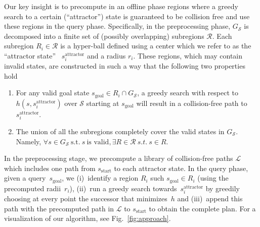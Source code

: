 \documentclass[letterpaper]{article} %
\newcommand{\calL}{\ensuremath{\mathcal{L}}\xspace}
\newcommand{\calS}{\ensuremath{\mathcal{S}}\xspace}
\newcommand{\calR}{\ensuremath{\mathcal{R}}\xspace}
\newcommand{\sAttract}{\ensuremath{s^{\text{attractor}}_i}\xspace}
\newcommand{\sStart}{\ensuremath{s_{\text{start}}\xspace}}
\newcommand{\sGoal}{\ensuremath{s_{\text{goal}}\xspace}}
\begin{document}
Our key insight is to precompute in an offline phase regions where a greedy search to a certain (``attractor'') state is guaranteed to be collision free and use these regions in the query phase.
Specifically, in the preprocessing phase, $G_\calS$ is decomposed into a finite  set of (possibly overlapping) subregions $\calR$.
Each subregion $R_i \in \calR$ is a hyper-ball defined using a center which we refer to as the ``attractor state''~
\sAttract and a radius $r_i$.
These regions, which may contain invalid states, are constructed in such a way that the following two properties hold
\begin{enumerate}[label={\textbf{P\arabic*}}]
  \item \label{property:1} For any valid goal state $s_{\text{goal}} \in R_i \cap G_\calS$, a greedy search with respect to $h(s, \sAttract)$ over $\calS$ starting at $\sGoal$ will result in a collision-free path to \sAttract.
  \item \label{property:2} The union of all the subregions completely cover the valid states in $G_\calS$. 
		  Namely, $\forall s \in G_\calS~\text{s.t.}~s~\text{is valid}, \exists R \in \calR \ s.t. \ s \in R$.
\end{enumerate}

In the preprocessing stage, we precompute a library of collision-free paths $\calL$ which includes one path from $\sStart$ to each attractor state. 
In the query phase, given a query~\sGoal, we 
(i)~identify a region $R_i$ such $\sGoal \in R_i$ (using the precomputed radii~$r_i$),
(ii)~run a greedy search towards~\sAttract by greedily choosing at every point the successor that minimizes~$h$ and
(iii)~append this path with the precomputed path in $\calL$ to $\sStart$ to obtain the complete plan.
For a visualization of our algorithm, see Fig.~\ref{fig:approach}.
\end{document}
